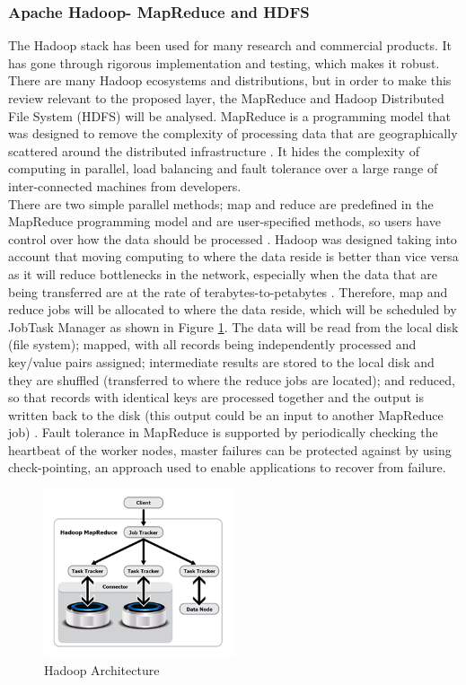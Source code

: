 \subsubsection{Apache Hadoop- MapReduce and HDFS} \label{subsubsec-lr-batchlayer-mr}
The Hadoop stack has been used for many research and commercial products. It has gone through rigorous implementation and testing, which makes it robust. There are many Hadoop ecosystems and distributions, but in order to make this review relevant to the proposed layer, the MapReduce and Hadoop Distributed File System (HDFS) will be analysed. MapReduce is a programming model that was designed to remove the complexity of processing data that are geographically scattered around the distributed infrastructure \cite{mr-com,mr-data}. It hides the complexity of computing in parallel, load balancing and fault tolerance over a large range of inter-connected machines from developers.\\

There are two simple parallel methods; map and reduce are predefined in the MapReduce programming model and are user-specified methods, so users have control over how the data should be processed \cite{mr-data}. Hadoop was designed taking into account that moving computing to where the data reside is better than vice versa as it will reduce bottlenecks in the network, especially when the data that are being transferred are at the rate of terabytes-to-petabytes \cite{mr-com}. Therefore, map and reduce jobs will be allocated to where the data reside, which will be scheduled by JobTask Manager as shown in Figure \ref{fig-map-reduce}. The data will be read from the local disk (file system); mapped, with all records being independently processed and key/value pairs assigned; intermediate results are stored to the local disk and they are shuffled (transferred to where the reduce jobs are located); and reduced, so that records with identical keys are processed together and the output is written back to the disk (this output could be an input to another MapReduce job) \cite{mr-com}. Fault tolerance in MapReduce is supported by periodically checking the heartbeat of the worker nodes, master failures can be protected against by using check-pointing, an approach used to enable applications to recover from failure.\\

\begin{figure}[H]
\centering
\includegraphics[width=0.5\textwidth]{Figures/map-reduce.png}
\caption{Hadoop Architecture}\label{fig-map-reduce}
\end{figure}

